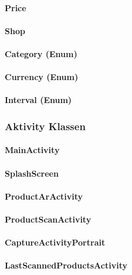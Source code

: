 \documentclass{scrartcl}
\begin{document}
\paragraph{Price}

\paragraph{Shop}

\paragraph{Category (Enum)}

\paragraph{Currency (Enum)}

\paragraph{Interval (Enum)}

\subsubsection{Aktivity Klassen}

\paragraph{MainActivity}

\paragraph{SplashScreen}

\paragraph{ProductArActivity}

\paragraph{ProductScanActivity}

\paragraph{CaptureActivityPortrait}

\paragraph{LastScannedProductsActivity}
\end{document}
